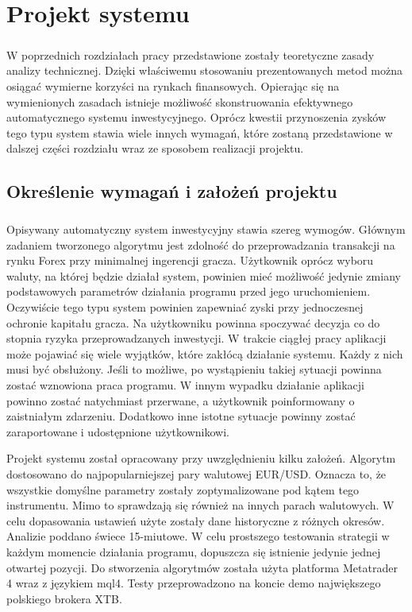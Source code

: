 \documentclass[pdflatex,11pt]{aghdpl}
\begin{document}
\chapter{Projekt systemu}
\label{chap:projekt}
\paragraph{}
W poprzednich rozdziałach pracy przedstawione zostały teoretyczne zasady analizy technicznej. Dzięki właściwemu stosowaniu prezentowanych metod można osiągać wymierne korzyści na rynkach finansowych. Opierając się na wymienionych zasadach istnieje możliwość skonstruowania efektywnego automatycznego systemu inwestycyjnego. Oprócz kwestii przynoszenia zysków tego typu system stawia wiele innych wymagań, które zostaną przedstawione w dalszej części rozdziału wraz ze sposobem realizacji projektu.

\section{Określenie wymagań i założeń projektu}
\paragraph{}

Opisywany automatyczny system inwestycyjny stawia szereg wymogów. Głównym zadaniem tworzonego algorytmu jest zdolność do przeprowadzania transakcji na rynku Forex przy minimalnej ingerencji gracza. Użytkownik oprócz wyboru waluty, na której będzie działał system, powinien mieć możliwość jedynie zmiany podstawowych parametrów działania programu przed jego uruchomieniem. Oczywiście tego typu system powinien zapewniać zyski przy jednoczesnej ochronie kapitału gracza. Na użytkowniku powinna spoczywać decyzja co do stopnia ryzyka przeprowadzanych inwestycji. W trakcie ciągłej pracy aplikacji może pojawiać się wiele wyjątków, które zakłócą działanie systemu. Każdy z nich musi być obsłużony. Jeśli to możliwe, po wystąpieniu takiej sytuacji powinna zostać wznowiona praca programu. W innym wypadku działanie aplikacji powinno zostać natychmiast przerwane, a użytkownik poinformowany o zaistniałym zdarzeniu. Dodatkowo inne istotne sytuacje powinny zostać zaraportowane i udostępnione użytkownikowi.  

Projekt systemu został opracowany przy uwzględnieniu kilku założeń. Algorytm dostosowano do najpopularniejszej pary walutowej EUR/USD. Oznacza to, że wszystkie domyślne parametry zostały zoptymalizowane pod kątem tego instrumentu. Mimo to sprawdzają się również na innych parach walutowych. W celu dopasowania ustawień użyte zostały dane historyczne z różnych okresów. Analizie poddano świece 15-miutowe. W celu prostszego testowania strategii w każdym momencie działania programu, dopuszcza się istnienie jedynie jednej otwartej pozycji. Do stworzenia algorytmów została użyta platforma Metatrader 4 wraz z językiem mql4. Testy przeprowadzono na koncie demo największego polskiego brokera XTB. 
\end{document}
